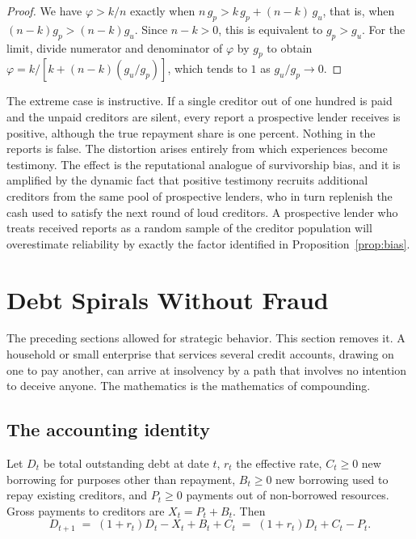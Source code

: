 \documentclass[11pt]{article}
\theoremstyle{definition}
\theoremstyle{remark}
\begin{document}
\begin{proof}
We have $\varphi>k/n$ exactly when $n\,g_p>k\,g_p+(n-k)\,g_u$, that is, when $(n-k)g_p>(n-k)g_u$. Since $n-k>0$, this is equivalent to $g_p>g_u$. For the limit, divide numerator and denominator of $\varphi$ by $g_p$ to obtain $\varphi=k/[k+(n-k)(g_u/g_p)]$, which tends to $1$ as $g_u/g_p\to 0$.
\end{proof}

The extreme case is instructive. If a single creditor out of one hundred is paid and the unpaid creditors are silent, every report a prospective lender receives is positive, although the true repayment share is one percent. Nothing in the reports is false. The distortion arises entirely from which experiences become testimony. The effect is the reputational analogue of survivorship bias, and it is amplified by the dynamic fact that positive testimony recruits additional creditors from the same pool of prospective lenders, who in turn replenish the cash used to satisfy the next round of loud creditors. A prospective lender who treats received reports as a random sample of the creditor population will overestimate reliability by exactly the factor identified in Proposition~\ref{prop:bias}.

\section{Debt Spirals Without Fraud}\label{sec:spirals}

The preceding sections allowed for strategic behavior. This section removes it. A household or small enterprise that services several credit accounts, drawing on one to pay another, can arrive at insolvency by a path that involves no intention to deceive anyone. The mathematics is the mathematics of compounding.

\subsection{The accounting identity}

Let $D_t$ be total outstanding debt at date $t$, $r_t$ the effective rate, $C_t\ge 0$ new borrowing for purposes other than repayment, $B_t\ge 0$ new borrowing used to repay existing creditors, and $P_t\ge 0$ payments out of non-borrowed resources. Gross payments to creditors are $X_t=P_t+B_t$. Then
\[
D_{t+1} \;=\; (1+r_t)D_t - X_t + B_t + C_t \;=\; (1+r_t)D_t + C_t - P_t .
\]
\end{document}
